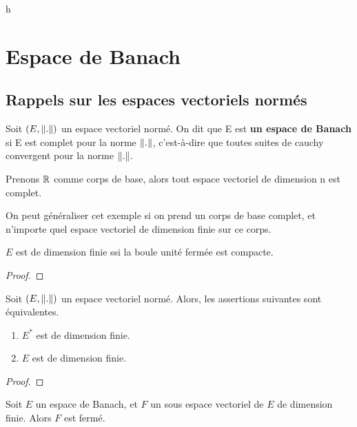 h\chapter{Espace de Banach}

\section{Rappels sur les espaces vectoriels normés}

\begin{definition} 
	Soit $(E, \norm{.})$ un espace vectoriel normé. On dit que E
	est \textbf{un espace de Banach} si E est complet pour la norme $\norm{.}$,
	c'est-à-dire que toutes suites de cauchy convergent pour la norme
	$\norm{.}$.
\end{definition}

Prenons $\mathbb{R}$ comme corps de base, alors tout espace vectoriel de dimension n
est complet.

On peut généraliser cet exemple si on prend un corps de base complet, et
n'importe quel espace vectoriel de dimension finie sur ce corps.

\begin{theorem} [Riesz]
\label{theorem_riesz_compact}
	$E$ est de dimension finie ssi la boule unité fermée est compacte.
\end{theorem}

\ifdefined\outputproof
\begin{proof}

\end{proof}
\fi

\begin{proposition}
\label{proposition_dual_dimension}
	Soit $(E, \norm{.})$ un espace vectoriel normé.
	Alors, les assertions suivantes sont équivalentes.
	\begin{enumerate}
		\item $E^{*}$ est de dimension finie.
		\item $E$ est de dimension finie.
	\end{enumerate}
\end{proposition}

\ifdefined\outputproof
\begin{proof}

\end{proof}
\fi

\begin{theorem}
\label{theorem_closed_vectorial_subspace}
	Soit $E$ un espace de Banach, et $F$ un sous espace vectoriel de $E$ de
	dimension finie.
	Alors $F$ est fermé.
\end{theorem}

